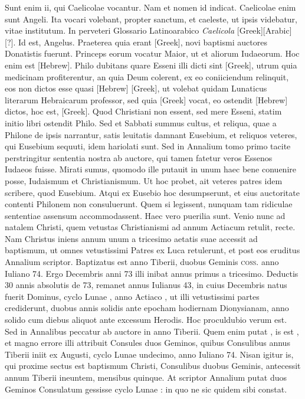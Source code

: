 Sunt enim ii, qui Caelicolae
vocantur.
Nam et nomen id indicat.
Caelicolae enim sunt
Angeli.
Ita vocari volebant, propter sanctum, et caeleste, ut ipsis videbatur,
vitae institutum.
In perveteri Glossario Latinoarabico \textit{Caelicola}
[Greek][Arabic][?].
Id est, Angelus.
Praeterea quia erant \textgreek{[Greek]}, novi
baptismi auctores Donatistis fuerunt.
Princeps eorum vocatur
Maior, ut et aliorum Iudaeorum.
Hoc enim est \texthebrew{[Hebrew]}.
Philo dubitans
quare Esseni illi dicti sint \textgreek{[Greek]},
 utrum quia medicinam profiterentur,
an quia Deum colerent, ex eo coniiciendum relinquit,
eos non dictos esse quasi \texthebrew{[Hebrew]} \textgreek{[Greek]},
 ut volebat quidam Lunaticus
literarum Hebraicarum professor, sed quia \textgreek{[Greek]} vocat, eo ostendit
\texthebrew{[Hebrew]} dictos, hoc est, \textgreek{[Greek]}.
Quod Christiani non essent, sed
mere Esseni, statim initio libri ostendit Philo.
Sed et Sabbati summus
cultus, et reliqua, quae a Philone de ipsis narrantur, satis leuitatis
damnant Eusebium, et reliquos veteres, qui Eusebium sequuti,
idem hariolati sunt.
Sed in Annalium tomo primo tacite perstringitur
sententia nostra ab auctore, qui tamen fatetur veros Essenos Iudaeos
fuisse.
Mirati sumus, quomodo ille putauit in unum haec bene
conuenire posse, Iudaismum et Christianismum.
Ut hoc probet, ait
veteres patres idem scribere, quod Eusebium.
Atqui ex Eusebio
hoc desumpserunt, et eius auctoritate contenti Philonem non consuluerunt.
Quem si legissent, nunquam tam ridiculae sententiae assensum
accommodassent.
Haec vero puerilia sunt.
Venio nunc ad natalem
Christi, quem vetustas Christianismi ad  annum Actiacum
retulit, recte.
Nam Christus iniens annum unum a tricesimo
aetatis suae accessit ad baptismum, ut omnes vetustissimi Patres ex
Luca retulerunt, et post eos eruditus Annalium scriptor.
Baptizatus est anno  Tiberii, duobus Geminis
 \textsc{coss}. anno Iuliano 74.
Ergo  Decembris anni 73 illi inibat annus
 primus a tricesimo.
Deductis 30 annis absolutis de 73, remanet annus Iulianus
43, in cuius  Decembris natus fuerit Dominus, cyclo Lunae
, anno Actiaco ,
 ut illi vetustissimi partes crediderunt,
duobus annis solidis ante epocham hodiernam Dionysianam,
anno solido cum diebus aliquot ante excessum Herodis.
Hoc proculdubio
verum est.
Sed in Annalibus peccatur ab auctore in anno
 Tiberii.
Quem enim putat , is est , et magno errore illi
attribuit Consules duos Geminos, quibus Consulibus annus 
Tiberii iniit ex  Augusti, cyclo Lunae undecimo, anno Iuliano
74.
Nisan igitur is, qui proxime sectus est baptismum Christi,
Consulibus duobus Geminis, antecessit annum  Tiberii ineuntem,
mensibus quinque.
At scriptor Annalium putat duos Geminos
Consulatum gessisse cyclo Lunae : in quo ne sic quidem
sibi constat.

